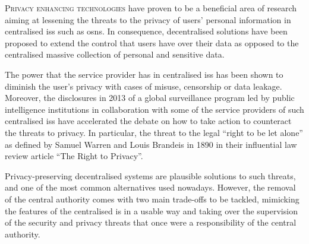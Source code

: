 


    {
    \lettrine{\textcolor[gray]{.25}{P}}{rivacy enhancing technologies}\csname@restorepar\endcsname\everypar{} 
    have proven to be a beneficial area of research aiming at lessening the threats 
    to the privacy of users' personal information in centralised \aclp*{is} such 
    as \aclp*{osn}. In consequence, decentralised solutions have been proposed to 
    extend the control that users have over their data as opposed to the centralised 
    massive collection of personal and sensitive data.\par
    }
    
    The power that the service provider has in centralised \aclp*{is} has been shown 
    to diminish the user's privacy with cases of misuse, censorship or data leakage. 
    Moreover, the disclosures in 2013 of a global surveillance program led by public 
    intelligence institutions in collaboration with some of the service providers 
    of such centralised \aclp*{is} have accelerated the debate on how to take action 
    to counteract the threats to privacy. In particular, the threat to the legal 
    ``right to be let alone'' as defined by Samuel Warren and Louis Brandeis in 
    1890 in their influential law review article ``The Right to Privacy''.
    
    Privacy-preserving decentralised systems are plausible solutions to such threats, 
    and one of the most common alternatives used nowadays. However, the removal 
    of the central authority comes with two main trade-offs to be tackled, mimicking 
    the features of the centralised \acl*{is} in a usable way and taking over the 
    supervision of the security and privacy threats that once were a responsibility 
    of the central authority.
    
